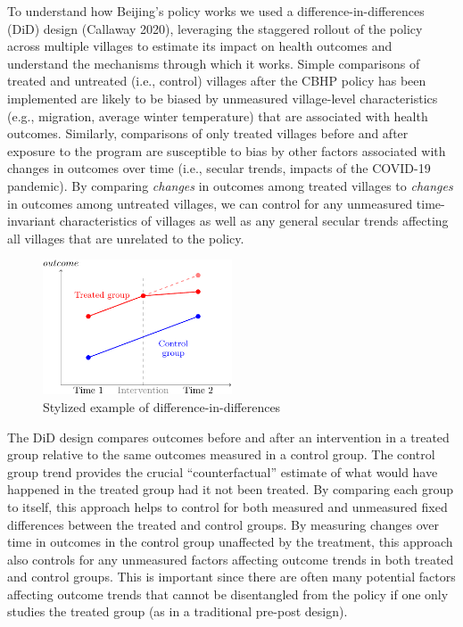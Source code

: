 \documentclass[
  letterpaper,
  DIV=11,
  numbers=noendperiod]{scrartcl}
\begin{document}
To understand how Beijing's policy works we used a
difference-in-differences (DiD) design (Callaway 2020), leveraging the
staggered rollout of the policy across multiple villages to estimate its
impact on health outcomes and understand the mechanisms through which it
works. Simple comparisons of treated and untreated (i.e., control)
villages after the CBHP policy has been implemented are likely to be
biased by unmeasured village-level characteristics (e.g., migration,
average winter temperature) that are associated with health outcomes.
Similarly, comparisons of only treated villages before and after
exposure to the program are susceptible to bias by other factors
associated with changes in outcomes over time (i.e., secular trends,
impacts of the COVID-19 pandemic). By comparing \emph{changes} in
outcomes among treated villages to \emph{changes} in outcomes among
untreated villages, we can control for any unmeasured time-invariant
characteristics of villages as well as any general secular trends
affecting all villages that are unrelated to the policy.

\begin{figure}[H]

{\centering \includegraphics[width=0.5\textwidth,height=\textheight]{hei-report_files/figure-pdf/fig-didfig-1.pdf}

}

\caption{\label{fig-didfig}Stylized example of
difference-in-differences}

\end{figure}

The DiD design compares outcomes before and after an intervention in a
treated group relative to the same outcomes measured in a control group.
The control group trend provides the crucial ``counterfactual'' estimate
of what would have happened in the treated group had it not been
treated. By comparing each group to itself, this approach helps to
control for both measured and unmeasured fixed differences between the
treated and control groups. By measuring changes over time in outcomes
in the control group unaffected by the treatment, this approach also
controls for any unmeasured factors affecting outcome trends in both
treated and control groups. This is important since there are often many
potential factors affecting outcome trends that cannot be disentangled
from the policy if one only studies the treated group (as in a
traditional pre-post design).
\end{document}
